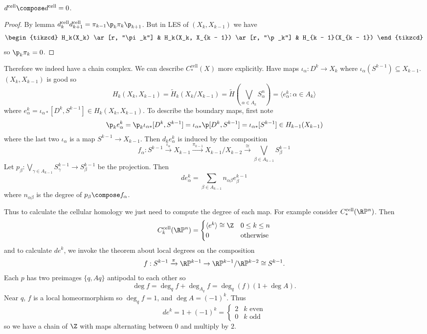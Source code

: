 \documentclass[a4paper]{article}
\renewcommand{\b}{\p}
\renewcommand*{\P}{\mathbb{P}}
\newcommand{\cell}{\mathrm{cell}}
\begin{document}
\begin{corollary}
  \(d^\cell \compose d^\cell = 0\).
\end{corollary}

\begin{proof}
  By lemma \(d_k^\cell d_{k + 1}^\cell = \pi_{k - 1} \b_k \pi_k \b_{k + 1}\). But in LES of \((X_k, X_{k - 1})\) we have
  \[
    \begin{tikzcd}
      H_k(X_k) \ar[r, "\pi_k"] & H_k(X_k, X_{k - 1}) \ar[r, "\b_k"] & H_{k - 1}(X_{k - 1})
    \end{tikzcd}
  \]
  so \(\b_k \pi_k = 0\).
\end{proof}

Therefore we indeed have a chain complex. We can describe \(C_*^\cell(X)\) more explicitly. Have maps \(\iota_\alpha: D^k \to X_k\) where \(\iota_\alpha(S^{k - 1}) \subseteq X_{k - 1}\). \((X_k, X_{k - 1})\) is good so
\[
  H_k(X_k, X_{k - 1}) = \widetilde H_k(X_k/X_{k - 1}) = \widetilde H(\bigvee_{\alpha \in A_k} S_\alpha^n) = \langle e_\alpha^k: \alpha \in A_k\rangle
\]
where \(e_\alpha^k = \iota_{\alpha*}[D^k, S^{k - 1}] \in H_k(X_k, X_{k - 1})\). To describe the boundary maps, first note
\[
  \b_k e_\alpha^k = \b_k \iota_{\alpha*} [D^k, S^{k - 1}] = \iota_{\alpha*} \b [D^k, S^{k - 1}] = \iota_{\alpha*}[S^{k - 1}] \in H_{k - 1}(X_{k - 1})
\]
where the last two \(\iota_\alpha\) is a map \(S^{k - 1} \to X_{k - 1}\). Then \(d_k e_\alpha^k\) is induced by the composition
\[
  f_\alpha: S^{k - 1} \xrightarrow{\iota_\alpha} X_{k - 1} \xrightarrow{\pi_{k - 1}} X_{k - 1}/X_{k - 2} \xrightarrow{\cong} \bigvee_{\beta \in A_{k - 1}} S^{k - 1}_\beta
\]
Let \(p_\beta: \bigvee_{\gamma \in A_{k - 1}} S_\gamma^{k - 1} \to S_\beta^{k - 1}\) be the projection. Then
\[
  d e_\alpha^k = \sum_{\beta \in A_{k - 1}} n_{\alpha\beta} e_\beta^{k - 1}
\]
where \(n_{\alpha\beta}\) is the degree of \(p_\beta \compose f_\alpha\).

Thus to calculate the cellular homology we just need to compute the degree of each map. For example consider \(C_*^\cell(\R\P^n)\). Then
\[
  C_k^\cell(\R\P^n) =
  \begin{cases}
    \langle e^k \rangle \cong \Z & 0 \leq k \leq n \\
    0 & \text{otherwise}
  \end{cases}
\]
and to calculate \(de^k\), we invoke the theorem about local degrees on the composition
\[
  f: S^{k - 1} \xrightarrow{\pi} \R\P^{k - 1} \to \R\P^{k - 1}/\R\P^{k - 2} \cong S^{k - 1}.
\]
Each \(p\) has two preimages \(\{q, Aq\}\) antipodal to each other so
\[
  \deg f = \deg_q f + \deg_{A_q} f = \deg_q(f) (1 + \deg A).
\]
Near \(q\), \(f\) is a local homeormorphism so \(\deg_q f = 1\), and \(\deg A = (-1)^k\). Thus
\[
  de^k = 1 + (-1)^k =
  \begin{cases}
    2 & k \text{ even} \\
    0 & k \text{ odd}
  \end{cases}
\]
so we have a chain of \(\Z\) with maps alternating between \(0\) and multiply by \(2\).
\end{document}
